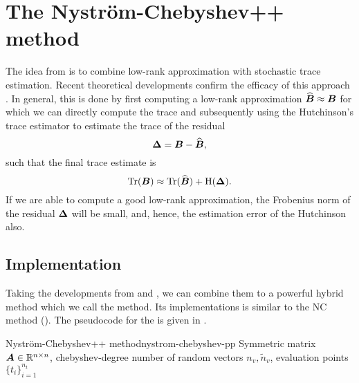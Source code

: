 \chapter{The Nystr\"om-Chebyshev++ method}
\label{chp:4-nystromchebyshev}

The idea from \cite{lin2017randomized} is to combine low-rank approximation
with stochastic trace estimation. Recent theoretical developments confirm the
efficacy of this approach \cite{meyer2021hutch,persson2022hutch}. In general,
this is done by first computing a low-rank approximation $\widehat{\boldsymbol{B}} \approx \boldsymbol{B}$
for which we can directly compute the trace and subsequently using the
Hutchinson's trace estimator 
to estimate the trace of the residual
\begin{equation}
    \boldsymbol{\Delta} = \boldsymbol{B} - \widehat{\boldsymbol{B}},
    \label{equ:4-nystromchebyshev-residual}
\end{equation}
such that the final trace estimate is
\begin{equation}
    \operatorname{Tr}(\boldsymbol{B}) \approx \operatorname{Tr}(\widehat{\boldsymbol{B}}) + \operatorname{H}(\boldsymbol{\Delta}).
    \label{equ:4-nystromchebyshev-hutch-pp}
\end{equation}
If we are able to compute a good low-rank approximation, the Frobenius norm
of the residual $\boldsymbol{\Delta}$ will be small, and, hence, the estimation
error of the Hutchinson  also.


\section{Implementation}
\label{sec:4-nystromchebyshev-implementation}

Taking the developments from  and ,
we can combine them to a powerful hybrid method which we call the 
method. Its implementations is similar to the \gls{NC} method ().
The pseudocode for the  is given in .

\begin{algo}{Nystr\"om-Chebyshev++ method}{nystrom-chebyshev-pp}
    Symmetric matrix $\boldsymbol{A} \in \mathbb{R}^{n \times n}$, 
    \gls{chebyshev-degree}
    number of random vectors $n_v, \widetilde{n}_v$,
    evaluation points $\{t_i\}_{i=1}^{n_t}$
    
\end{algo}

